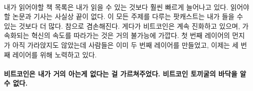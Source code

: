 \paragraph{}
내가 읽어야할 책 목록은 내가 읽을 수 있는 것보다 훨씬 빠르게 늘어나고 있다. 
읽어야 할 논문과 기사는 사실상 끝이 없다.
이 모든 주제를 다루는 팟캐스트는 내가 들을 수 있는 것보다 더 많다. 
참으로 겸손해진다.
게다가 비트코인은 계속 진화하고 있으며, 가속화되는 혁신의 속도를 따라가는 것은 거의 불가능에 가깝다.
첫 번째 레이어의 먼지가 아직 가라앉지도 않았는데 사람들은 이미 두 번째 레이어를 만들었고, 이제는 세 번째 레이어를 위해 노력하고 있다.

\paragraph{비트코인은 내가 거의 아는게 없다는 걸 가르쳐주었다. 비트코인 토끼굴의 바닥을 알 수 없다.}
%
%
%
%
%
